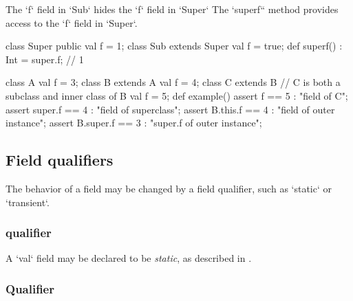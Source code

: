 \begin{ex}
The \xcd`f` field in \xcd`Sub` hides the \xcd`f` field in \xcd`Super`
The \xcd`superf`` method provides access to the \xcd`f` field in \xcd`Super`.
\begin{xten}
class Super{ 
  public val f = 1; 
}
class Sub extends Super {
  val f = true;
  def superf() : Int = super.f; // 1
}
\end{xten}
\end{ex}

\begin{xten}
class A {
   val f = 3;
}
class B extends A {
   val f = 4;
   class C extends B {
      // C is both a subclass and inner class of B
      val f = 5;
       def example() {
         assert f         == 5 : "field of C";
         assert super.f   == 4 : "field of superclass";
         assert B.this.f  == 4 : "field of outer instance";
         assert B.super.f == 3 : "super.f of outer instance";
       }
    }
}
\end{xten}


\subsection{Field qualifiers}
\label{FieldQualifier}

The behavior of a field may be changed by a field qualifier, such as
\xcd`static` or \xcd`transient`.  


\subsubsection{ qualifier}

A \xcd`val` field may be declared to be {\em static}, as described in
. 

\subsubsection{ Qualifier}
\label{TransientFields}

